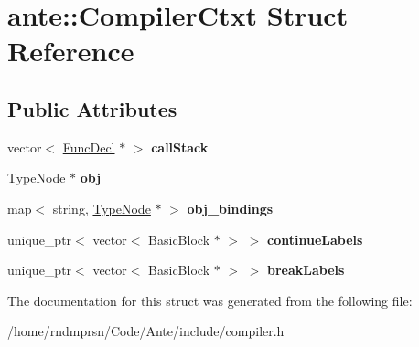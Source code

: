 \hypertarget{structante_1_1CompilerCtxt}{}\section{ante\+:\+:Compiler\+Ctxt Struct Reference}
\label{structante_1_1CompilerCtxt}
\subsection*{Public Attributes}
\begin{DoxyCompactItemize}
\item 
\mbox{\label{structante_1_1CompilerCtxt_ad3a8d321de607741bc5cdd84606c9268}} 
vector$<$ \hyperlink{structFuncDecl}{Func\+Decl} $\ast$ $>$ {\bfseries call\+Stack}
\item 
\mbox{\label{structante_1_1CompilerCtxt_a76e2ad053c025b27e63258d6184b6038}} 
\hyperlink{structTypeNode}{Type\+Node} $\ast$ {\bfseries obj}
\item 
\mbox{\label{structante_1_1CompilerCtxt_a847236bcd9b1851292e596ecf486fd99}} 
map$<$ string, \hyperlink{structTypeNode}{Type\+Node} $\ast$ $>$ {\bfseries obj\+\_\+bindings}
\item 
\mbox{\label{structante_1_1CompilerCtxt_aa4b3a24aa21e2b215228908984bd3122}} 
unique\+\_\+ptr$<$ vector$<$ Basic\+Block $\ast$ $>$ $>$ {\bfseries continue\+Labels}
\item 
\mbox{\label{structante_1_1CompilerCtxt_ad278064df0104a9883d299a3eaa43e13}} 
unique\+\_\+ptr$<$ vector$<$ Basic\+Block $\ast$ $>$ $>$ {\bfseries break\+Labels}
\end{DoxyCompactItemize}


The documentation for this struct was generated from the following file\+:\begin{DoxyCompactItemize}
\item 
/home/rndmprsn/\+Code/\+Ante/include/compiler.\+h\end{DoxyCompactItemize}
